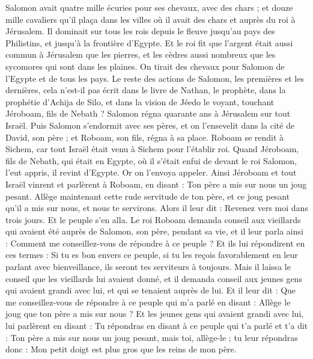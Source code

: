 \begin{multicols}{2}
Salomon avait quatre mille écuries pour ses chevaux, avec des chars ; et douze mille cavaliers qu'il plaça dans les villes où il avait des chars et auprès du roi à Jérusalem.
Il dominait sur tous les rois depuis le fleuve jusqu'au pays des Philistins, et jusqu'à la frontière d'Egypte.
Et le roi fit que l'argent était aussi commun à Jérusalem que les pierres, et les cèdres aussi nombreux que les sycomores qui sont dans les plaines.
On tirait des chevaux pour Salomon de l'Egypte et de tous les pays.
Le reste des actions de Salomon, les premières et les dernières, cela n'est-il pas écrit dans le livre de Nathan, le prophète, dans la prophétie d'Achija de Silo, et dans la vision de Jéedo le voyant, touchant Jéroboam, fils de Nebath ?
Salomon régna quarante ans à Jérusalem sur tout Israël.
Puis Salomon s'endormit avec ses pères, et on l'ensevelit dans la cité de David, son père ; et Roboam, son fils, régna à sa place.
\VerseOne{}Roboam se rendit à Sichem, car tout Israël était venu à Sichem pour l'établir roi.
Quand Jéroboam, fils de Nebath, qui était en Egypte, où il s'était enfui de devant le roi Salomon, l'eut appris, il revint d'Egypte.
Or on l'envoya appeler. Ainsi Jéroboam et tout Israël vinrent et parlèrent à Roboam, en disant :
Ton père a mis sur nous un joug pesant. Allège maintenant cette rude servitude de ton père, et ce joug pesant qu'il a mis sur nous, et nous te servirons.
Alors il leur dit : Revenez vers moi dans trois jours. Et le peuple s'en alla.
Le roi Roboam demanda conseil aux vieillards qui avaient été auprès de Salomon, son père, pendant sa vie, et il leur parla ainsi : Comment me conseillez-vous de répondre à ce peuple ?
Et ils lui répondirent en ces termes : Si tu es bon envers ce peuple, si tu les reçois favorablement en leur parlant avec bienveillance, ils seront tes serviteurs à toujours.
Mais il laissa le conseil que les vieillards lui avaient donné, et il demanda conseil aux jeunes gens qui avaient grandi avec lui, et qui se tenaient auprès de lui.
Et il leur dit : Que me conseillez-vous de répondre à ce peuple qui m'a parlé en disant : Allège le joug que ton père a mis sur nous ?
Et les jeunes gens qui avaient grandi avec lui, lui parlèrent en disant : Tu répondras en disant à ce peuple qui t'a parlé et t'a dit : Ton père a mis sur nous un joug pesant, mais toi, allège-le ; tu leur répondras donc : Mon petit doigt est plus gros que les reins de mon père.

\end{multicols}
